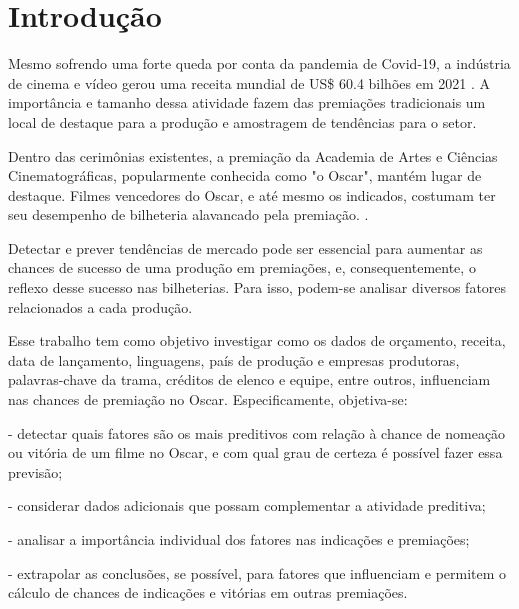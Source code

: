 
\chapter[Introdução]{Introdução}
Mesmo sofrendo uma forte queda por conta da pandemia de Covid-19, a indústria de cinema e vídeo gerou uma receita mundial de US\$ 60.4 bilhões em 2021 \cite{indiantelevision2021}. A importância e tamanho dessa atividade fazem das premiações tradicionais um local de destaque para a produção e amostragem de tendências para o setor.\par
Dentro das cerimônias existentes, a premiação da Academia de Artes e Ciências Cinematográficas, popularmente conhecida como "o Oscar", mantém lugar de destaque. Filmes vencedores do Oscar, e até mesmo os indicados, costumam ter seu desempenho de bilheteria alavancado pela premiação. \cite{hdsr2020}.

Detectar e prever tendências de mercado pode ser essencial para aumentar as chances de sucesso de uma produção em premiações, e, consequentemente, o reflexo desse sucesso nas bilheterias. Para isso, podem-se analisar diversos fatores relacionados a cada produção.\par

Esse trabalho tem como objetivo investigar como os dados de orçamento, receita, data de lançamento, linguagens, país de produção e empresas produtoras, palavras-chave da trama, créditos de elenco e equipe, entre outros, influenciam nas chances de premiação no Oscar. Especificamente, objetiva-se:\par

- detectar quais fatores são os mais preditivos com relação à chance de nomeação ou vitória de um filme no Oscar, e com qual grau de certeza é possível fazer essa previsão;\par
- considerar dados adicionais que possam complementar a atividade preditiva;\par
- analisar a importância individual dos fatores nas indicações e premiações;\par
- extrapolar as conclusões, se possível, para fatores que influenciam e permitem o cálculo de chances de indicações e vitórias em outras premiações.\par
\par

